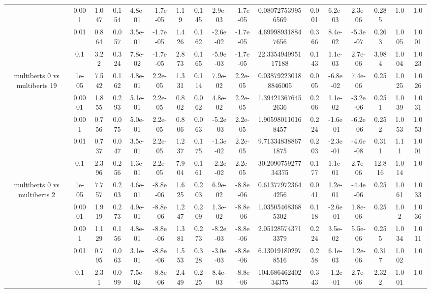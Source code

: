 \begin{tabular}{|c|c|c|c|c|c|c|c|c|c|c|c|c|c|c|c|c|}
 & 0.001 & 1.047 & 0.154 & 4.8e-01 & -1.7e-05 & 1.19 & 0.145 & 2.9e-03 & -1.7e-05 & 0.080727539956569 & 0.001 & 6.2e-03 & 2.3e-06 & 0.285 & 1.0 & 1.0 \\
 & 0.01 & 0.864 & 0.057 & 3.5e-01 & -1.7e-05 & 1.426 & 0.162 & -2.6e-02 & -1.7e-05 & 4.699989318847656 & 0.366 & 8.4e-02 & -5.3e-07 & 0.263 & 1.005 & 1.001 \\
 & 0.1 & 3.22 & 0.324 & 7.8e-02 & -1.7e-05 & 2.873 & 0.165 & -5.9e-03 & -1.7e-05 & 22.335494995117188 & 0.143 & 1.1e-03 & 2.7e-06 & 3.984 & 1.004 & 1.023 \\
\hline
\multirow{5}{*}{multiberts 0 vs multiberts 19} & 1e-05 & 7.542 & 0.162 & 4.8e-01 & 2.2e-05 & 1.331 & 0.114 & 7.9e-02 & 2.2e-05 & 0.038792230188846005 & 0.005 & -6.8e-02 & 7.4e-06 & 0.25 & 1.025 & 1.026 \\
 & 0.0001 & 1.855 & 0.293 & 5.1e-01 & 2.2e-05 & 0.802 & 0.062 & 4.8e-02 & 2.2e-05 & 1.394213676452636 & 0.206 & 1.1e-02 & -3.2e-06 & 0.251 & 1.039 & 1.031 \\
 & 0.001 & 0.756 & 0.075 & 5.0e-01 & 2.2e-05 & 0.806 & 0.063 & -5.2e-03 & 2.2e-05 & 1.905980110168457 & 0.224 & -1.6e-01 & -6.2e-06 & 0.252 & 1.053 & 1.053 \\
 & 0.01 & 0.737 & 0.047 & 3.5e-01 & 2.2e-05 & 1.237 & 0.175 & -1.3e-02 & 2.2e-05 & 9.713348388671875 & 0.203 & -2.3e-01 & -4.6e-08 & 0.311 & 1.11 & 1.001 \\
 & 0.1 & 2.396 & 0.256 & 1.3e-01 & 2.2e-05 & 7.904 & 0.161 & -2.2e-02 & 2.2e-05 & 30.209075927734375 & 0.177 & 1.1e-01 & 2.7e-06 & 12.816 & 1.014 & 1.0 \\
\hline
\multirow{5}{*}{multiberts 0 vs multiberts 2} & 1e-05 & 7.757 & 0.203 & 4.6e-01 & -8.8e-06 & 1.625 & 0.203 & 6.9e-02 & -8.8e-06 & 0.613779723644256 & 0.041 & 1.2e-01 & -4.4e-06 & 0.25 & 1.061 & 1.033 \\
 & 0.0001 & 1.919 & 0.273 & 4.9e-01 & -8.8e-06 & 1.247 & 0.209 & 1.3e-02 & -8.8e-06 & 1.035054683685302 & 0.118 & -2.6e-01 & 1.8e-06 & 0.25 & 1.02 & 1.036 \\
 & 0.001 & 1.129 & 0.156 & 4.8e-01 & -8.8e-06 & 1.381 & 0.273 & -8.2e-03 & -8.8e-06 & 2.051285743713379 & 0.224 & 3.5e-02 & 5.5e-06 & 0.255 & 1.034 & 1.011 \\
 & 0.01 & 0.795 & 0.063 & 3.1e-01 & -8.8e-06 & 1.553 & 0.328 & -3.0e-03 & -8.8e-06 & 6.130191802978516 & 0.258 & 6.1e-03 & 1.2e-06 & 0.317 & 1.002 & 1.0 \\
 & 0.1 & 2.31 & 0.099 & 7.5e-02 & -8.8e-06 & 2.449 & 0.225 & 8.4e-03 & -8.8e-06 & 104.68646240234375 & 0.343 & -1.2e-01 & 2.7e-06 & 2.322 & 1.001 & 1.0 \\

\end{tabular}
